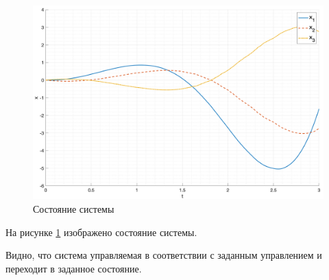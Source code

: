 \begin{figure}
    \centering
    \includegraphics[width=\textwidth]{media/plots/task2_states.png}
    \caption{Состояние системы}
    \label{fig:task1_state}
\end{figure}
На рисунке \ref{fig:task1_state} изображено состояние системы.

Видно, что система управляемая в соответствии с заданным управлением и переходит в заданное состояние. 

